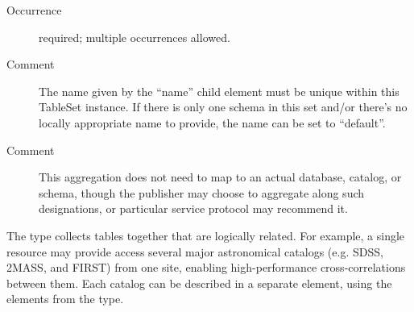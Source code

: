 \documentclass[11pt,a4paper]{ivoa}
\begin{document}
\begin{generated}
\begin{bigdescription}
\begin{description}
\item[Occurrence] required; multiple occurrences allowed.
\item[Comment] 
                The name given by the “name” child element must
                be unique within this TableSet instance.  If there is
                only one schema in this set and/or there's no locally
                appropriate name to provide, the name can be set to
                “default”.  
              
\item[Comment] 
                This aggregation does not need to map to an
                actual database, catalog, or schema, though the
                publisher may choose to aggregate along such
                designations, or particular service protocol may
                recommend it.  
              

\end{description}


\end{bigdescription}\endgroup

\endgroup
\end{generated}



The  type collects
tables together that are logically related.
For example, a single
resource may provide access several major astronomical catalogs
(e.g. SDSS, 2MASS, and FIRST) from one site, enabling high-performance
cross-correlations between them.  Each catalog can be described in a
separate  element, using the elements from
the  type.
\end{document}
